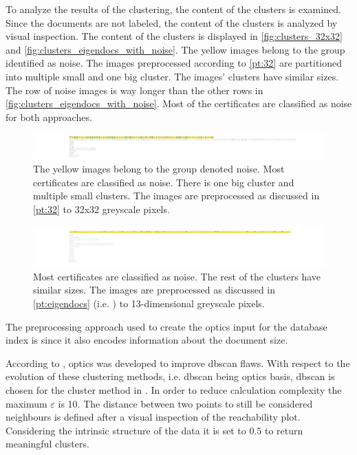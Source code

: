 To analyze the results of the clustering, the content of the clusters is examined.
Since the documents are not labeled, the content of the clusters is analyzed by visual inspection.
The content of the clusters is displayed in \autoref{fig:clusters_32x32} and \autoref{fig:clusters_eigendocs_with_noise}.
The yellow images belong to the group identified as noise.
The images preprocessed according to \autoref{pt:32} are partitioned into multiple small and one big cluster.
The \eigendocs{} images' clusters have similar sizes. 
The row of noise images is way longer than the other rows in \autoref{fig:clusters_eigendocs_with_noise}.
Most of the certificates are classified as noise for both approaches.


\begin{figure}[!htb] %
    \centering
    \includegraphics[width=1.05\textwidth]{images/OPTICS/32x32/cluster_content_32x32.pdf}
    \caption[Detailed \ac{optics} clusters using 32x32 greyscale pixels]{The yellow images belong to the group denoted noise.
    Most certificates are classified as noise.
    There is one big cluster and multiple small clusters.
    The images are preprocessed as discussed in \autoref{pt:32} to 32x32 greyscale pixels.
    }
    \label{fig:clusters_32x32}
\end{figure}

\begin{figure}[!htb] %
    \centering
    \includegraphics[width=1.05\textwidth]{images/OPTICS/eigendocs/cluster_content_incl_noise_Eigendocs.pdf}
    \caption[Detailed \ac{optics} clusters using \eigendocs{}]{Most certificates are classified as noise. The rest of the clusters have similar sizes.
    The images are preprocessed as discussed in \autoref{pt:eigendocs} (i.e. \eigendocs{}) to 13-dimensional greyscale pixels.
    }
    \label{fig:clusters_eigendocs_with_noise}
\end{figure}


The preprocessing approach used to create the \ac{optics} input for the \databaseName{} database index is \eigendocs{} 
since it also encodes information about the document size. 

According to \citeauthor{OPTICS2014}, \ac{optics} was developed to improve \ac{dbscan} flaws.
With respect to the evolution of these clustering methods, i.e. \ac{dbscan} being \ac{optics} basis, 
\ac{dbscan} is chosen for the cluster method in .
In order to reduce calculation complexity the maximum $\varepsilon$ is 10.
The distance between two points to still be considered neighbours is defined after a visual inspection of the reachability plot.
Considering the intrinsic structure of the data it is set to $0.5$ to return meaningful clusters.